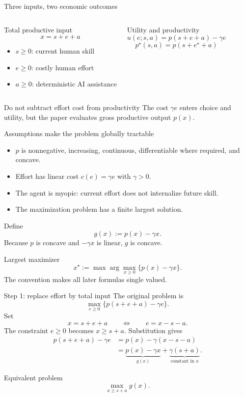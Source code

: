 \documentclass[aspectratio=169,10pt]{beamer}
\begin{document}
\begin{frame}{Three inputs, two economic outcomes}
\begin{columns}[T,onlytextwidth]
\begin{block}{Total productive input}
\[
x=s+e+a
\]
\begin{itemize}
  \item $s\ge0$: current human skill
  \item $e\ge0$: costly human effort
  \item $a\ge0$: deterministic AI assistance
\end{itemize}
\end{block}
\begin{block}{Utility and productivity}
\[
u(e;s,a)=p(s+e+a)-\gamma e
\]
\[
p^\star(s,a)=p(s+e^\star+a)
\]
\end{block}
\end{columns}
\vspace{3mm}
\begin{alertblock}{Do not subtract effort cost from productivity}
The cost $\gamma e$ enters choice and utility, but the paper evaluates gross productive output $p(x)$.
\end{alertblock}
\end{frame}

\begin{frame}{Assumptions make the problem globally tractable}
\begin{itemize}
  \item $p$ is nonnegative, increasing, continuous, differentiable where required, and concave.
  \item Effort has linear cost $c(e)=\gamma e$ with $\gamma>0$.
  \item The agent is myopic: current effort does not internalize future skill.
  \item The maximization problem has a finite largest solution.
\end{itemize}
\vspace{4mm}
Define
\[
g(x):=p(x)-\gamma x.
\]
Because $p$ is concave and $-\gamma x$ is linear, $g$ is concave.
\begin{block}{Largest maximizer}
\[
x^\star:=\max\arg\max_{x\ge0}\{p(x)-\gamma x\}.
\]
The convention makes all later formulas single valued.
\end{block}
\end{frame}

\begin{frame}{Step 1: replace effort by total input}
The original problem is
\[
\max_{e\ge0}\{p(s+e+a)-\gamma e\}.
\]
Set
\[
x=s+e+a
\qquad\Longleftrightarrow\qquad
e=x-s-a.
\]
The constraint $e\ge0$ becomes $x\ge s+a$. Substitution gives
\begin{align*}
p(s+e+a)-\gamma e
&=p(x)-\gamma(x-s-a)\\
&=\underbrace{p(x)-\gamma x}_{g(x)}
+\underbrace{\gamma(s+a)}_{\text{constant in }x}.
\end{align*}
\begin{block}{Equivalent problem}
\[
\max_{x\ge s+a}g(x).
\]
\end{block}
\end{frame}
\end{document}
